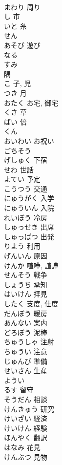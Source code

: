 \documentclass[8pt]{extreport}
\begin{document}
\begin{CJK}{UTF8}{min}
\\	まわり	周り
\\	し	市
\\	いと	糸
\\	せん	
\\	あそび	遊び
\\	なる	
\\	すみ	
\\	隅
\\	こ	子, 児
\\	つき	月
\\	おたく	お宅, 御宅
\\	くさ	草
\\	ばい	倍
\\	くん	
\\	おいわい	お祝い
\\	ごちそう	
\\	げしゅく	下宿
\\	せわ	世話
\\	よてい	予定
\\	こうつう	交通
\\	にゅうがく	入学
\\	にゅういん	入院
\\	れいぼう	冷房
\\	しゅっせき	出席
\\	しゅっぱつ	出発
\\	りよう	利用
\\	げんいん	原因
\\	けんか	喧嘩, 諠譁
\\	せんそう	戦争
\\	しょうち	承知
\\	はいけん	拝見
\\	したく	支度, 仕度
\\	だんぼう	暖房
\\	あんない	案内
\\	どろぼう	泥棒
\\	ちゅうしゃ	注射
\\	ちゅうい	注意
\\	じゅんび	準備
\\	せいさん	生産
\\	ようい	
\\	るす	留守
\\	そうだん	相談
\\	けんきゅう	研究
\\	けいざい	経済
\\	けいけん	経験
\\	ほんやく	翻訳
\\	はなみ	花見
\\	けんぶつ	見物

\end{CJK}
\end{document}
